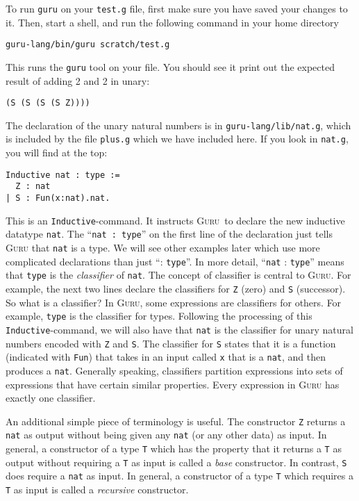 \documentclass{book}[12pt]
\newcommand{\guru}[0]{\textsc{Guru}\xspace}
\begin{document}
To run \texttt{guru} on your \texttt{test.g} file, first make sure
you have saved your changes to it.  Then, start a shell, and run
the following command in your home directory

\begin{verbatim}
guru-lang/bin/guru scratch/test.g
\end{verbatim}

\noindent This runs the \texttt{guru} tool on your file.  You should
see it print out the expected result of adding 2 and 2 in unary:

\begin{verbatim}
(S (S (S (S Z))))
\end{verbatim}

The declaration of the unary natural numbers is in
\texttt{guru-lang/lib/nat.g}, which is included by the file
\texttt{plus.g} which we have included here.  If you look in
\texttt{nat.g}, you will find at the top:

\begin{verbatim}
Inductive nat : type :=
  Z : nat
| S : Fun(x:nat).nat.
\end{verbatim}

\noindent This is an \texttt{Inductive}-command.  It instructs \guru\
to declare the new inductive datatype \texttt{nat}.  The ``\texttt{nat
: type}'' on the first line of the declaration just tells \guru that
\texttt{nat} is a type.  We will see other examples later which use
more complicated declarations than just ``: \texttt{type}''.  In more
detail, ``\texttt{nat} : \texttt{type}'' means that \texttt{type} is
the \emph{classifier} of \texttt{nat}.  The concept of classifier is
central to \guru.  For example, the next two lines declare the
classifiers for \texttt{Z} (zero) and \texttt{S} (successor).  So what
is a classifier?  In \guru, some expressions are classifiers for
others.  For example, \texttt{type} is the classifier for types.
Following the processing of this \texttt{Inductive}-command, we will
also have that \texttt{nat} is the classifier for unary natural
numbers encoded with \texttt{Z} and \texttt{S}.  The classifier for
\texttt{S} states that it is a function (indicated with \texttt{Fun})
that takes in an input called \texttt{x} that is a \texttt{nat}, and
then produces a \texttt{nat}.  Generally speaking, classifiers
partition expressions into sets of expressions that have certain
similar properties.  Every expression in \textsc{Guru} has exactly one
classifier.

An additional simple piece of terminology is useful.  The constructor
\texttt{Z} returns a \texttt{nat} as output without being given any
\texttt{nat} (or any other data) as input.  In general, a constructor
of a type \texttt{T} which has the property that it returns a
\texttt{T} as output without requiring a \texttt{T} as input is called
a \emph{base} constructor.  In contrast, \texttt{S} does require a
\texttt{nat} as input.  In general, a constructor of a type \texttt{T}
which requires a \texttt{T} as input is called a \emph{recursive}
constructor.
\end{document}
